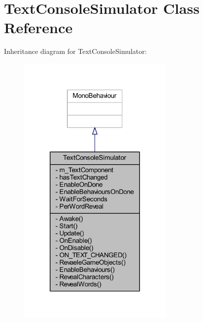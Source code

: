 \hypertarget{class_text_console_simulator}{}\section{Text\+Console\+Simulator Class Reference}
\label{class_text_console_simulator}


Inheritance diagram for Text\+Console\+Simulator\+:
\nopagebreak
\begin{figure}[H]
\begin{center}
\leavevmode
\includegraphics[width=215pt]{class_text_console_simulator__inherit__graph}
\end{center}
\end{figure}


